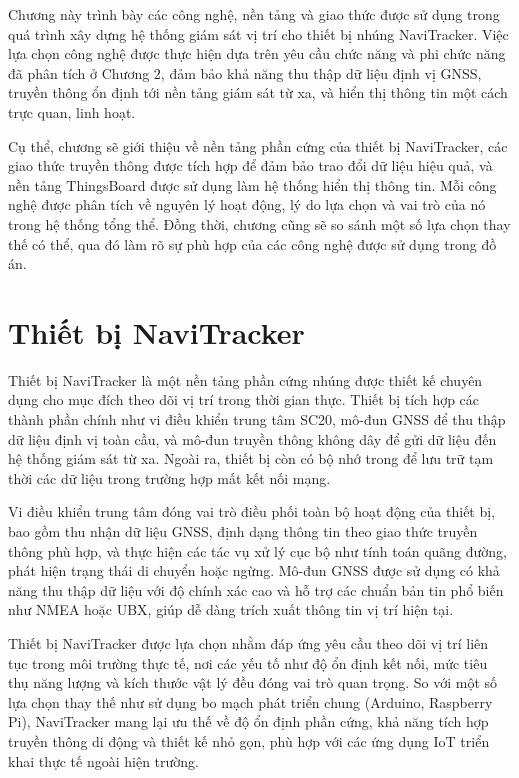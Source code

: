 \documentclass[../DoAn.tex]{subfiles}
\begin{document}
Chương này trình bày các công nghệ, nền tảng và giao thức được sử dụng trong quá trình xây dựng hệ thống giám sát vị trí cho thiết bị nhúng NaviTracker. Việc lựa chọn công nghệ được thực hiện dựa trên yêu cầu chức năng và phi chức năng đã phân tích ở Chương 2, đảm bảo khả năng thu thập dữ liệu định vị GNSS, truyền thông ổn định tới nền tảng giám sát từ xa, và hiển thị thông tin một cách trực quan, linh hoạt.

Cụ thể, chương sẽ giới thiệu về nền tảng phần cứng của thiết bị NaviTracker, các giao thức truyền thông được tích hợp để đảm bảo trao đổi dữ liệu hiệu quả, và nền tảng ThingsBoard được sử dụng làm hệ thống hiển thị thông tin. Mỗi công nghệ được phân tích về nguyên lý hoạt động, lý do lựa chọn và vai trò của nó trong hệ thống tổng thể. Đồng thời, chương cũng sẽ so sánh một số lựa chọn thay thế có thể, qua đó làm rõ sự phù hợp của các công nghệ được sử dụng trong đồ án.
\section{Thiết bị NaviTracker}
\label{section:3.1}
Thiết bị NaviTracker là một nền tảng phần cứng nhúng được thiết kế chuyên dụng cho mục đích theo dõi vị trí trong thời gian thực. Thiết bị tích hợp các thành phần chính như vi điều khiển trung tâm SC20, mô-đun GNSS để thu thập dữ liệu định vị toàn cầu, và mô-đun truyền thông không dây để gửi dữ liệu đến hệ thống giám sát từ xa. Ngoài ra, thiết bị còn có bộ nhớ trong để lưu trữ tạm thời các dữ liệu trong trường hợp mất kết nối mạng.

Vi điều khiển trung tâm đóng vai trò điều phối toàn bộ hoạt động của thiết bị, bao gồm thu nhận dữ liệu GNSS, định dạng thông tin theo giao thức truyền thông phù hợp, và thực hiện các tác vụ xử lý cục bộ như tính toán quãng đường, phát hiện trạng thái di chuyển hoặc ngừng. Mô-đun GNSS được sử dụng có khả năng thu thập dữ liệu với độ chính xác cao và hỗ trợ các chuẩn bản tin phổ biến như NMEA hoặc UBX, giúp dễ dàng trích xuất thông tin vị trí hiện tại.

Thiết bị NaviTracker được lựa chọn nhằm đáp ứng yêu cầu theo dõi vị trí liên tục trong môi trường thực tế, nơi các yếu tố như độ ổn định kết nối, mức tiêu thụ năng lượng và kích thước vật lý đều đóng vai trò quan trọng. So với một số lựa chọn thay thế như sử dụng bo mạch phát triển chung (Arduino, Raspberry Pi), NaviTracker mang lại ưu thế về độ ổn định phần cứng, khả năng tích hợp truyền thông di động và thiết kế nhỏ gọn, phù hợp với các ứng dụng IoT triển khai thực tế ngoài hiện trường.
\end{document}
